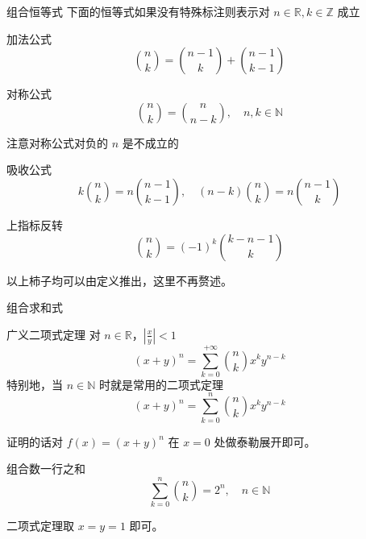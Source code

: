 \documentclass[UTF8]{beamer}
\begin{document}
    \begin{frame}{组合恒等式}
        下面的恒等式如果没有特殊标注则表示对 $n\in \mathbb R,k\in \mathbb Z$ 成立
        \begin{block}{加法公式}
        $$
        \binom nk = \binom{n-1}{k}+\binom{n-1}{k-1}
        $$
        \end{block}
        \pause

        \begin{block}{对称公式}
            $$
            \binom nk = \binom n{n-k},\quad n,k\in \mathbb N
            $$

            注意对称公式对负的 $n$ 是不成立的
        \end{block}
    \end{frame}

    \begin{frame}
        \begin{block}{吸收公式}
            $$
            k\binom{n}{k}=n\binom{n-1}{k-1},\quad (n-k)\binom nk = n\binom{n-1}{k}
            $$
        \end{block}
        \begin{block}{上指标反转}
            $$
            \binom nk=(-1)^k\binom{k-n-1}k
            $$
        \end{block}
        \pause
        以上柿子均可以由定义推出，这里不再赘述。
    \end{frame}

    \begin{frame}{组合求和式}
        \begin{block}{广义二项式定理}
            对 $n\in \mathbb R$，$|\frac{x}{y}|<1$
            \vspace{-0.5em}
            $$
            (x+y)^n = \sum_{k=0}^{+\infty}\binom{n}{k}x^ky^{n-k}
            $$
            特别地，当 $n\in \mathbb N$ 时就是常用的二项式定理
            \vspace{-0.5em}
            $$
            (x+y)^n = \sum_{k=0}^{n}\binom{n}{k}x^ky^{n-k}
            $$\vspace{-1em}
        \end{block}
        证明的话对 $f(x)=(x+y)^n$ 在 $x=0$ 处做泰勒展开即可。
        \pause
        \begin{block}{组合数一行之和}\vspace{-1em}
            $$
            \sum_{k=0}^n \binom nk=2^n,\quad n\in\mathbb{N}
            $$\vspace{-1em}
        \end{block}
        二项式定理取 $x=y=1$ 即可。
    \end{frame}
\end{document}
